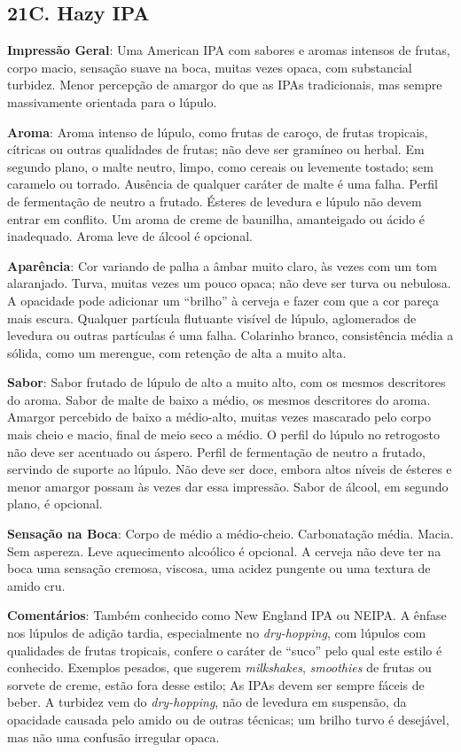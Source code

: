 \subsection*{21C. Hazy IPA}
\textbf{Impressão Geral}: Uma American IPA com sabores e aromas intensos de frutas, corpo macio, sensação suave na boca, muitas vezes opaca, com substancial turbidez. Menor percepção de amargor do que as IPAs tradicionais, mas sempre massivamente orientada para o lúpulo.

\textbf{Aroma}: Aroma intenso de lúpulo, como frutas de caroço, de frutas tropicais, cítricas ou outras qualidades de frutas; não deve ser gramíneo ou herbal. Em segundo plano, o malte neutro, limpo, como cereais ou levemente tostado; sem caramelo ou torrado. Ausência de qualquer caráter de malte é uma falha. Perfil de fermentação de neutro a frutado. Ésteres de levedura e lúpulo não devem entrar em conflito. Um aroma de creme de baunilha, amanteigado ou ácido é inadequado. Aroma leve de álcool é opcional.

\textbf{Aparência}: Cor variando de palha a âmbar muito claro, às vezes com um tom alaranjado. Turva, muitas vezes um pouco opaca; não deve ser turva ou nebulosa. A opacidade pode adicionar um “brilho” à cerveja e fazer com que a cor pareça mais escura. Qualquer partícula flutuante visível de lúpulo, aglomerados de levedura ou outras partículas é uma falha. Colarinho branco, consistência média a sólida, como um merengue, com retenção de alta a muito alta.

\textbf{Sabor}: Sabor frutado de lúpulo de alto a muito alto, com os mesmos descritores do aroma. Sabor de malte de baixo a médio, os mesmos descritores do aroma. Amargor percebido de baixo a médio-alto, muitas vezes mascarado pelo corpo mais cheio e macio, final de meio seco a médio. O perfil do lúpulo no retrogosto não deve ser acentuado ou áspero. Perfil de fermentação de neutro a frutado, servindo de suporte ao lúpulo. Não deve ser doce, embora altos níveis de ésteres e menor amargor possam às vezes dar essa impressão. Sabor de álcool, em segundo plano, é opcional.

\textbf{Sensação na Boca}: Corpo de médio a médio-cheio. Carbonatação média. Macia. Sem aspereza. Leve aquecimento alcoólico é opcional. A cerveja não deve ter na boca uma sensação cremosa, viscosa, uma acidez pungente ou uma textura de amido cru.

\textbf{Comentários}: Também conhecido como New England IPA ou NEIPA. A ênfase nos lúpulos de adição tardia, especialmente no \textit{dry-hopping}, com lúpulos com qualidades de frutas tropicais, confere o caráter de “suco” pelo qual este estilo é conhecido. Exemplos pesados, que sugerem \textit{milkshakes}, \textit{smoothies} de frutas ou sorvete de creme, estão fora desse estilo; As IPAs devem ser sempre fáceis de beber. A turbidez vem do \textit{dry-hopping}, não de levedura em suspensão, da opacidade causada pelo amido ou de outras técnicas; um brilho turvo é desejável, mas não uma confusão irregular opaca.

